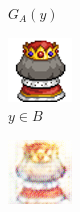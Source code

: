 \documentclass{beamer}
\begin{document}
\begin{frame}
\begin{figure}[htb]
\begin{subfigure}[b]{0.23\linewidth}
        \caption{$G_A(y)$}
      \end{subfigure}
      \begin{subfigure}[b]{0.23\linewidth}
        \includegraphics[width=\linewidth]{exp2_epoch004_real_B.png}
        \caption{$y \in B$}
      \end{subfigure}
      \begin{subfigure}[b]{0.23\linewidth}
        \includegraphics[width=\linewidth]{exp2_epoch004_fake_A.png}

\end{subfigure}
\end{figure}
\end{frame}
\end{document}
